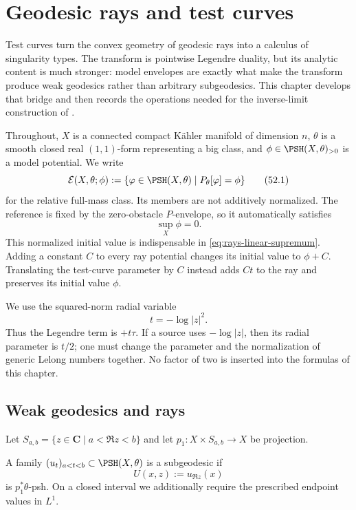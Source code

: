 \chapter{Geodesic rays and test curves}
\label{chap:rays-test-curves}

Test curves turn the convex geometry of geodesic rays into a calculus of
singularity types.  The transform is pointwise Legendre duality, but its
analytic content is much stronger: model envelopes are exactly what make
the transform produce weak geodesics rather than arbitrary
subgeodesics.  This chapter develops that bridge and then records the
operations needed for the inverse-limit construction of
.

Throughout, $X$ is a connected compact K\"ahler manifold of dimension $n$,
$\theta$ is a smooth closed real $(1,1)$-form representing a big class, and
$\phi\in\PSH(X,\theta)_{>0}$ is a model potential.  We write
\[
 \mathcal E(X,\theta;\phi)
 :=\{\varphi\in\PSH(X,\theta)\mid P_\theta[\varphi]=\phi\}
\tag{52.1}\label{eq:rays-relative-full-mass}
\]
for the relative full-mass class.  Its members are not additively
normalized.  The reference is fixed by the zero-obstacle $P$-envelope,
so it automatically satisfies
\[
                              \sup_X\phi=0.
\]
This normalized initial value is indispensable in
\eqref{eq:rays-linear-supremum}.  Adding a constant $C$ to every ray
potential changes its initial value to $\phi+C$.  Translating the
test-curve parameter by $C$ instead adds $Ct$ to the ray and preserves
its initial value $\phi$.

We use the squared-norm radial variable
\[
                              t=-\log|z|^2.
\]
Thus the Legendre term is $+t\tau$.  If a source uses
$-\log|z|$, then its radial parameter is $t/2$; one must change the
parameter and the normalization of generic Lelong numbers together.  No
factor of two is inserted into the formulas of this chapter.

\section{Weak geodesics and rays}
\label{sec:rays-weak-geodesics}

Let $S_{a,b}=\{z\in\mathbf C\mid a<\Re z<b\}$ and let
$p_1:X\times S_{a,b}\to X$ be projection.

\begin{definition}[Subgeodesic]
\label{def:rays-subgeodesic}
A family $(u_t)_{a<t<b}\subset\PSH(X,\theta)$ is a subgeodesic if
\[
                 U(x,z):=u_{\Re z}(x)
\tag{52.2}\label{eq:rays-complexification}
\]
is $p_1^*\theta$-psh.  On a closed interval we additionally require
the prescribed endpoint values in $L^1$.
\end{definition}

